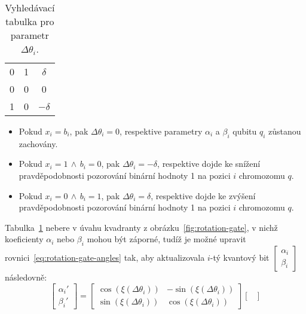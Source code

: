 \begin{enumerate}
\begin{table}[ht!]
\begin{tabular}{|c c|c|}
            0     & 1     & $\delta$              \\ 
            0     & 0     & 0                \\ 
            1     & 0     & $-\delta$             \\
            \hline
            \end{tabular}
            \caption{Vyhledávací tabulka pro parametr $\Delta\theta_i$.}
            \label{tab:look-up-table-Delta}
        \end{table}
        \begin{itemize}
            \item Pokud $x_i = b_i$, pak $\Delta\theta_i = 0$, respektive parametry $\alpha_i$ a $\beta_i$ qubitu $q_i$ zůstanou zachovány.
            \item Pokud $x_i = 1\,\wedge\,b_i = 0$, pak $\Delta\theta_i = -\delta$, respektive dojde ke snížení pravděpodobnosti pozorování binární hodnoty 1 na pozici $i$ chromozomu $q$. 
            \item Pokud $x_i = 0\,\wedge\,b_i = 1$, pak $\Delta\theta_i =  \delta$, respektive dojde ke zvýšení pravděpodobnosti pozorování binární hodnoty 1 na pozici $i$ chromozomu $q$. 
        \end{itemize}
        Tabulka~\ref{tab:look-up-table-Delta} nebere v úvahu kvadranty z obrázku~\ref{fig:rotation-gate}, v nichž koeficienty $\alpha_i$ nebo $\beta_i$ mohou být záporné, tudíž je možné upravit rovnici~\ref{eq:rotation-gate-angles} tak, aby aktualizovala $i$-tý kvantový bit $\begin{bmatrix} \alpha_i \\ \beta_i \end{bmatrix}$ následovně:
        \begin{equation}\label{eq:rotation-gate-angles-update}
            \begin{bmatrix}
                \alpha_i' \\
                \beta_i' 
            \end{bmatrix}
            =
            \begin{bmatrix}
                \cos{\left( \xi \left( \Delta\theta_i \right) \right)} & - \sin{\left( \xi \left( \Delta\theta_i \right) \right)} \\
                \sin{\left( \xi \left( \Delta\theta_i \right) \right)} &   \cos{\left( \xi \left( \Delta\theta_i \right) \right)}
            \end{bmatrix}
            \begin{bmatrix}

\end{bmatrix}
\end{equation}
\end{enumerate}
